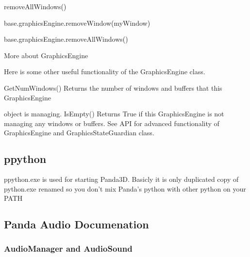 \documentclass[a4paper]{article}
\newcommand\textstyleOOoComputerIdent[1]{\textrm{\textcolor[rgb]{0.0,0.5019608,0.0}{#1}}}
\newcommand\textstyleOOoComputerBase[1]{\textrm{\textcolor{black}{#1}}}
\begin{document}
{\ttfamily\color{black}
\textstyleOOoComputerIdent{removeAllWindows}\textstyleOOoComputerBase{()}}

{\ttfamily\color{black}
\textstyleOOoComputerIdent{base}\textstyleOOoComputerBase{.}\textstyleOOoComputerIdent{graphicsEngine}\textstyleOOoComputerBase{.}\textstyleOOoComputerIdent{removeWindow}\textstyleOOoComputerBase{(}\textstyleOOoComputerIdent{myWindow}\textstyleOOoComputerBase{)}}

{\ttfamily\color{black}
\textstyleOOoComputerIdent{base}\textstyleOOoComputerBase{.}\textstyleOOoComputerIdent{graphicsEngine}\textstyleOOoComputerBase{.}\textstyleOOoComputerIdent{removeAllWindows}\textstyleOOoComputerBase{()}}


\bigskip

{\color{black}
More about GraphicsEngine}


\bigskip

{\color{black}
Here is some other useful functionality of the GraphicsEngine class.}

{\color{black}
GetNumWindows() Returns the number of windows and buffers that this GraphicsEngine}

{\color{black}
object is managing. IsEmpty() Returns True if this GraphicsEngine is not managing any windows or buffers. See API for
advanced functionality of GraphicsEngine and GraphicsStateGuardian class.}

\clearpage\subsection[ppython]{ppython}
\hypertarget{RefHeading3861869075401}{}{\centering\color{black}
ppython.exe is used for starting Panda3D. Basicly it is only duplicated copy of python.exe renamed so you don't mix
Panda's python with other python on your PATH
\par}

\clearpage\subsection[Panda Audio Documenation]{Panda Audio Documenation}
\hypertarget{RefHeading4102869075401}{}\subsubsection{}
\subsubsection[AudioManager and AudioSound]{AudioManager and AudioSound}
\hypertarget{RefHeading4104869075401}{}
\bigskip
\end{document}
